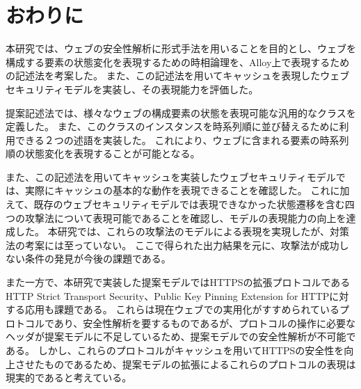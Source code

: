 \documentclass[12pt,a4paper]{jbook}
\begin{document}
\newpage

\chapter{おわりに}
本研究では、ウェブの安全性解析に形式手法を用いることを目的とし、ウェブを構成する要素の状態変化を表現するための時相論理を、Alloy上で表現するための記述法を考案した。
また、この記述法を用いてキャッシュを表現したウェブセキュリティモデルを実装し、その表現能力を評価した。

提案記述法では、様々なウェブの構成要素の状態を表現可能な汎用的なクラスを定義した。
また、このクラスのインスタンスを時系列順に並び替えるために利用できる２つの述語を実装した。
これにより、ウェブに含まれる要素の時系列順の状態変化を表現することが可能となる。

また、この記述法を用いてキャッシュを実装したウェブセキュリティモデルでは、実際にキャッシュの基本的な動作を表現できることを確認した。
これに加えて、既存のウェブセキュリティモデルでは表現できなかった状態遷移を含む四つの攻撃法について表現可能であることを確認し、モデルの表現能力の向上を達成した。
本研究では、これらの攻撃法のモデルによる表現を実現したが、対策法の考案には至っていない。
ここで得られた出力結果を元に、攻撃法が成功しない条件の発見が今後の課題である。

また一方で、本研究で実装した提案モデルではHTTPSの拡張プロトコルであるHTTP Strict Transport Security\cite{hsts}、Public Key Pinning Extension for HTTP\cite{hpkp}に対する応用も課題である。
これらは現在ウェブでの実用化がすすめられているプロトコルであり、安全性解析を要するものであるが、プロトコルの操作に必要なヘッダが提案モデルに不足しているため、提案モデルでの安全性解析が不可能である。
しかし、これらのプロトコルがキャッシュを用いてHTTPSの安全性を向上させたものであるため、提案モデルの拡張によるこれらのプロトコルの表現は現実的であると考えている。
\end{document}
